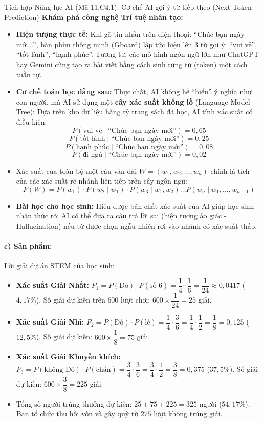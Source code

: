 \documentclass[12pt, a4paper]{article}
\begin{document}
\begin{aibox}{Tích hợp Năng lực AI (Mã 11.C4.1): Cơ chế AI gợi ý từ tiếp theo (Next Token Prediction)}
\textbf{Khám phá công nghệ Trí tuệ nhân tạo:}
\begin{itemize}[leftmargin=0.5cm]
    \item \textbf{Hiện tượng thực tế:} Khi gõ tin nhắn trên điện thoại: ``Chúc bạn ngày mới...'', bàn phím thông minh (Gboard) lập tức hiện lên 3 từ gợi ý: ``vui vẻ'', ``tốt lành'', ``hạnh phúc''. Tương tự, các mô hình ngôn ngữ lớn như ChatGPT hay Gemini cũng tạo ra bài viết bằng cách sinh từng từ (token) một cách tuần tự.
    \item \textbf{Cơ chế toán học đằng sau:} Thực chất, AI không hề ``hiểu'' ý nghĩa như con người, mà AI sử dụng một \textbf{cây xác suất khổng lồ} (Language Model Tree):
    Dựa trên kho dữ liệu hàng tỷ trang sách đã học, AI tính xác suất có điều kiện:
    $$P(\text{vui vẻ} \mid \text{``Chúc bạn ngày mới''}) = 0{,}65$$
    $$P(\text{tốt lành} \mid \text{``Chúc bạn ngày mới''}) = 0{,}25$$
    $$P(\text{hạnh phúc} \mid \text{``Chúc bạn ngày mới''}) = 0{,}08$$
    $$P(\text{đi ngủ} \mid \text{``Chúc bạn ngày mới''}) = 0{,}02$$
    \item Xác suất của toàn bộ một câu văn dài $W = (w_1, w_2, \dots, w_n)$ chính là tích của các xác suất rẽ nhánh liên tiếp trên cây ngôn ngữ:
    $$P(W) = P(w_1) \cdot P(w_2 \mid w_1) \cdot P(w_3 \mid w_1, w_2) \dots P(w_n \mid w_1, \dots, w_{n-1})$$
    \item \textbf{Bài học cho học sinh:} Hiểu được bản chất xác suất của AI giúp học sinh nhận thức rõ: AI có thể đưa ra câu trả lời sai (hiện tượng ảo giác - Hallucination) nếu từ được chọn ngẫu nhiên rơi vào nhánh có xác suất thấp.
\end{itemize}
\end{aibox}

\paragraph{c) Sản phẩm:} Lời giải dự án STEM của học sinh:
\begin{itemize}[leftmargin=0.8cm]
    \item \textbf{Xác suất Giải Nhất:} $P_1 = P(\text{Đỏ}) \cdot P(\text{số 6}) = \dfrac{1}{4} \cdot \dfrac{1}{6} = \dfrac{1}{24} \approx 0{,}0417$ ($4{,}17\%$).
    Số giải dự kiến trên $600$ lượt chơi: $600 \times \dfrac{1}{24} = 25$ giải.
    \item \textbf{Xác suất Giải Nhì:} $P_2 = P(\text{Đỏ}) \cdot P(\text{lẻ}) = \dfrac{1}{4} \cdot \dfrac{3}{6} = \dfrac{1}{4} \cdot \dfrac{1}{2} = \dfrac{1}{8} = 0{,}125$ ($12{,}5\%$).
    Số giải dự kiến: $600 \times \dfrac{1}{8} = 75$ giải.
    \item \textbf{Xác suất Giải Khuyến khích:} $P_3 = P(\text{không Đỏ}) \cdot P(\text{chẵn}) = \dfrac{3}{4} \cdot \dfrac{3}{6} = \dfrac{3}{4} \cdot \dfrac{1}{2} = \dfrac{3}{8} = 0{,}375$ ($37{,}5\%$).
    Số giải dự kiến: $600 \times \dfrac{3}{8} = 225$ giải.
    \item Tổng số người trúng thưởng dự kiến: $25 + 75 + 225 = 325$ người ($54{,}17\%$). Ban tổ chức thu hồi vốn và gây quỹ từ $275$ lượt không trúng giải.
\end{itemize}
\end{document}
